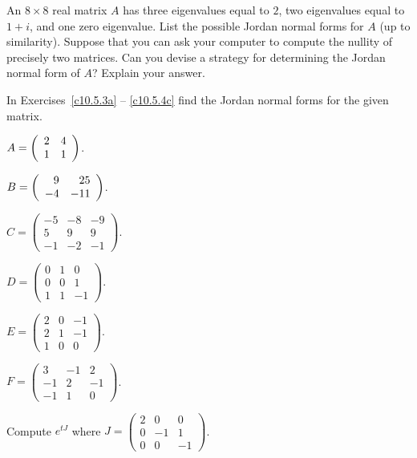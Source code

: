\begin{exercise}  \label{c10.5.2C}
An $8\times 8$ real matrix $A$ has three eigenvalues equal to $2$, two 
eigenvalues equal to $1+i$, and one zero eigenvalue.  List the possible 
Jordan normal forms for $A$ (up to similarity).  Suppose that you can ask 
your computer to compute the nullity of precisely two matrices.  Can you 
devise a strategy for determining the Jordan normal form of $A$?  Explain 
your answer.
\end{exercise}

\noindent In Exercises~\ref{c10.5.3a} -- \ref{c10.5.4c} find the 
Jordan normal forms for the given matrix.
\begin{exercise} \label{c10.5.3a}
$A = \left(\begin{array}{rr} 2 & 4\\ 1 &1\end{array}\right)$. 
\end{exercise}
\begin{exercise} \label{c10.5.3b}
$B = \left(\begin{array}{rr} 9 & 25\\ -4 &-11\end{array}\right)$.
\end{exercise}
\begin{exercise} \label{c10.5.4}
$C = \left(\begin{array}{rrr} -5 & -8 & -9 \\  5 & 9 & 9 \\
 -1 & -2 & -1 \end{array}\right)$.
\end{exercise}
\begin{exercise} \label{c10.5.4a}
$D = \left(\begin{array}{rrr} 0 & 1 & 0 \\  0 & 0 & 1 \\
1 & 1 & -1 \end{array}\right)$.
\end{exercise}
\begin{exercise} \label{c10.5.4b}
$E = \left(\begin{array}{rrr} 2 & 0 & -1 \\  2 & 1 & -1 \\
1 & 0 & 0 \end{array}\right)$.
\end{exercise}
\begin{exercise} \label{c10.5.4c}
$F = \left(\begin{array}{rrr} 3 & -1 & 2 \\  -1 & 2 & -1 \\
-1 & 1 & 0 \end{array}\right)$.
\end{exercise}

\begin{exercise}  \label{c10.5.5A}
Compute $e^{tJ}$ where $J=\left(\begin{array}{rrr} 2 & 0 & 0 \\  0 & -1 & 1 \\
0 & 0 & -1 \end{array}\right)$.
\end{exercise}

